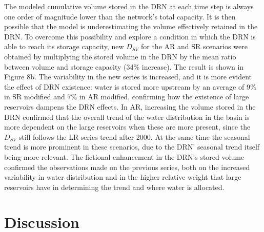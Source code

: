 \documentclass[draft]{agujournal2019}
\begin{document}
The modeled cumulative volume stored in the DRN at each time step is always one order of magnitude lower than the network’s total capacity. It is then possible that the model is underestimating the volume effectively retained in the DRN. To overcome this possibility and explore a condition in which the DRN is able to reach its storage capacity, new $D_{SV}$ for the AR and SR scenarios were obtained by multiplying the stored volume in the DRN by the mean ratio between volume and storage capacity (34\% increase). The result is shown in Figure 8b. The variability in the new series is increased, and it is more evident the effect of DRN existence: water is stored more upstream by an average of 9\% in SR modified and 7\% in AR modified, confirming how the existence of large reservoirs dampens the DRN effects. In AR, increasing the volume stored in the DRN confirmed that the overall trend of the water distribution in the basin is more dependent on the large reservoirs when these are more present, since the $D_{SV}$ still follows the LR series trend after 2000. At the same time the seasonal trend is more prominent in these scenarios, due to the DRN’ seasonal trend itself being more relevant. The fictional enhancement in the DRN’s stored volume confirmed the observations made on the previous series, both on the increased variability in water distribution and in the higher relative weight that large reservoirs have in determining the trend and where water is allocated.

\section{Discussion}
\end{document}
